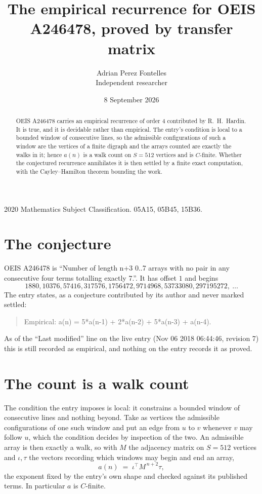 \documentclass[11pt,a4paper]{article}
\title{The empirical recurrence for OEIS A246478, proved by transfer matrix}
\author{Adrian Perez Fontelles\\ \small Independent researcher}
\date{8 September 2026}
\theoremstyle{plain}
\theoremstyle{definition}
\begin{document}
\maketitle

\begin{abstract}
OEIS A246478 carries an empirical recurrence of order $4$ contributed by R.~H.~Hardin. It is
true, and it is decidable rather than empirical. The entry's condition is local to a bounded window of consecutive lines, so
the admissible configurations of such a window are the vertices of a finite digraph and the
arrays counted are exactly the walks in it; hence $a(n)$ is a walk count on $S=512$ vertices
and is $C$-finite. Whether the conjectured recurrence annihilates it is then settled by a
finite exact computation, with the Cayley--Hamilton theorem bounding the work.
\end{abstract}

\noindent\small 2020 Mathematics Subject Classification. 05A15, 05B45, 15B36.\normalsize

\section{The conjecture}

OEIS A246478 is ``Number of length n+3 0..7 arrays with no pair in any consecutive four terms totalling exactly 7.''. It has offset $1$ and begins
\[
1880, 10376, 57416, 317576, 1756472, 9714968, 53733080, 297195272,\ \dots
\]
The entry states, as a conjecture contributed by its author and never marked settled:
\begin{quote}
Empirical: a(n) = 5*a(n-1) + 2*a(n-2) + 5*a(n-3) + a(n-4).
\end{quote}
As of the ``Last modified'' line on the live entry (Nov 06 2018 06:44:46, revision 7) this is still
recorded as empirical, and nothing on the entry records it as proved.

\section{The count is a walk count}

The condition the entry imposes is local: it constrains a bounded window of consecutive lines and nothing beyond. Take as
vertices the admissible configurations of one such window and put an edge from $u$ to $v$
whenever $v$ may follow $u$, which the condition decides by inspection of the two. An
admissible array is then exactly a walk, so with $M$ the adjacency matrix on $S=512$ vertices
and $\iota,\tau$ the vectors recording which windows may begin and end an array,
\[
a(n)\;=\;\iota^{\!\top}M^{\,n+2}\tau ,
\]
the exponent fixed by the entry's own shape and checked against its published terms. In
particular $a$ is $C$-finite.
\end{document}

